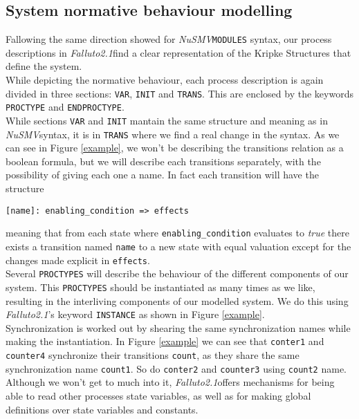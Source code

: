\documentclass[12pt]{article}
\newcommand{\nusmv}{\mbox{\textit{NuSMV}}}
\newcommand{\falluto}{\mbox{\textit{Falluto2.1}}}
\begin{document}
\subsection{System normative behaviour modelling}
Fallowing the same direction showed for \nusmv \texttt{MODULES} syntax, our process descriptions in \falluto find a clear representation of the Kripke Structures that define the system.\\
While depicting the normative behaviour, each process description is again divided in three sections: \texttt{VAR}, \texttt{INIT} and \texttt{TRANS}. This are enclosed by the keywords \texttt{PROCTYPE} and \texttt{ENDPROCTYPE}.\\
While sections \texttt{VAR} and \texttt{INIT} mantain the same structure and meaning as in \nusmv syntax, it is in \texttt{TRANS} where we find a real change in the syntax. As we can see in Figure \ref{example}, we won't be describing the transitions relation as a boolean formula, but we will describe each transitions separately, with the possibility of giving each one a name. In fact each transition will have the structure
\begin{center}
\texttt{[name]: enabling\_condition => effects}
\end{center}
meaning that from each state where \texttt{enabling\_condition} evaluates to \textit{true} there exists a transition named \texttt{name} to a new state with equal valuation except for the changes made explicit in \texttt{effects}.\\
Several \texttt{PROCTYPES} will describe the behaviour of the different components of our system. This \texttt{PROCTYPES} should be instantiated as many times as we like, resulting in the interliving components of our modelled system. We do this using \falluto's keyword \texttt{INSTANCE} as shown in Figure \ref{example}.\\
Synchronization is worked out by shearing the same synchronization names while making the instantiation. In Figure \ref{example} we can see that \texttt{conter1} and \texttt{counter4} synchronize their transitions \texttt{count}, as they share the same synchronization name \texttt{count1}. So do \texttt{conter2} and \texttt{counter3} using \texttt{count2} name.\\
Although we won't get to much into it, \falluto offers mechanisms for being able to read other processes state variables, as well as for making global definitions over state variables and constants.
\end{document}
